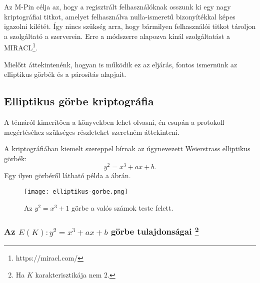 Az M-Pin célja az, hogy a regisztrált felhasználóknak osszunk ki egy nagy kriptográfiai titkot, amelyet felhasználva nulla-ismeretű bizonyítékkal képes igazolni kilétét. Így nincs szükség arra, hogy bármilyen felhasználói titkot tároljon a szolgáltató a szerverein. Erre a módszerre alapozva kínál szolgáltatást a MIRACL\footnote{https://miracl.com/}.

Mielőtt áttekintenénk, hogyan is működik ez az eljárás, fontos ismernünk az elliptikus görbék és a párosítás alapjait.

\subsection*{Elliptikus görbe kriptográfia}

A témáról kimerítően a \cite{ECCGuide, ECCHandbook} könyvekben lehet olvasni, én csupán a protokoll megértéséhez szükséges részleteket szeretném áttekinteni.

A kriptográfiában kiemelt szereppel bírnak az úgynevezett Weierstrass elliptikus görbék: $$y^2 = x^3 + ax + b.$$ Egy ilyen görbéről látható példa a  ábrán.

\begin{figure}[H]
    \centering
    \texttt{[image: elliptikus-gorbe.png]}
    \caption{Az $y^2 = x^3 + 1$ görbe a valós számok teste felett.}
    \label{Figure::ECC::EllipticCurve}
\end{figure}

\subsubsection*{Az $E(K) : y^2 = x^3 + ax + b$ görbe tulajdonságai \protect\footnote{Ha $K$ karakterisztikája nem $2$.}}

